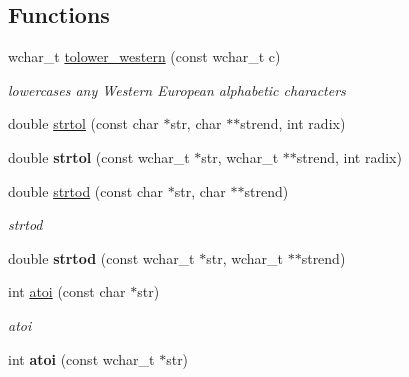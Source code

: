 \subsection*{Functions}
\begin{DoxyCompactItemize}
\item 
\hypertarget{namespacestring__util_a65ecd19fe84afd9cff4f1715f9364141}{wchar\-\_\-t \hyperlink{namespacestring__util_a65ecd19fe84afd9cff4f1715f9364141}{tolower\-\_\-western} (const wchar\-\_\-t c)}\label{namespacestring__util_a65ecd19fe84afd9cff4f1715f9364141}

\begin{DoxyCompactList}\small\item\em lowercases any Western European alphabetic characters \end{DoxyCompactList}\item 
double \hyperlink{namespacestring__util_a27a24858b465560e8f0b083d2fa80ce4}{strtol} (const char $\ast$str, char $\ast$$\ast$strend, int radix)
\item 
\hypertarget{namespacestring__util_a6acf272c0e68f0b5f2381ad59db3055c}{double {\bfseries strtol} (const wchar\-\_\-t $\ast$str, wchar\-\_\-t $\ast$$\ast$strend, int radix)}\label{namespacestring__util_a6acf272c0e68f0b5f2381ad59db3055c}

\item 
\hypertarget{namespacestring__util_a563de3552dde86286bcff20cfaac49a9}{double \hyperlink{namespacestring__util_a563de3552dde86286bcff20cfaac49a9}{strtod} (const char $\ast$str, char $\ast$$\ast$strend)}\label{namespacestring__util_a563de3552dde86286bcff20cfaac49a9}

\begin{DoxyCompactList}\small\item\em strtod \end{DoxyCompactList}\item 
\hypertarget{namespacestring__util_a75191bc768437cc444054667f18af344}{double {\bfseries strtod} (const wchar\-\_\-t $\ast$str, wchar\-\_\-t $\ast$$\ast$strend)}\label{namespacestring__util_a75191bc768437cc444054667f18af344}

\item 
\hypertarget{namespacestring__util_adf6fc44dacb428d9928401574d5bc819}{int \hyperlink{namespacestring__util_adf6fc44dacb428d9928401574d5bc819}{atoi} (const char $\ast$str)}\label{namespacestring__util_adf6fc44dacb428d9928401574d5bc819}

\begin{DoxyCompactList}\small\item\em atoi \end{DoxyCompactList}\item 
\hypertarget{namespacestring__util_a4f2cd4dfa1c657252314e26c608a835c}{int {\bfseries atoi} (const wchar\-\_\-t $\ast$str)}\label{namespacestring__util_a4f2cd4dfa1c657252314e26c608a835c}


\end{DoxyCompactItemize}
